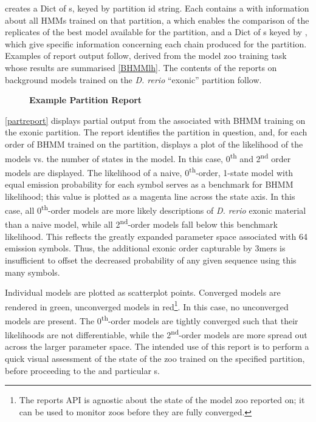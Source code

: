 creates a Dict of s, keyed by partition id string. Each  contains a  with information about all HMMs trained on that partition, a  which enables the comparison of the replicates of the best model available for the partition, and a Dict of s keyed by , which give specific information concerning each chain produced for the partition. Examples of report output follow, derived from the model zoo training task whose results are summarised \autoref{BHMMlh}. The contents of the reports on background models trained on the \textit{D. rerio} ``exonic'' partition follow.

\begin{figure}[!h]
    \caption{{\bf Example \protect{} Partition Report}}
    \label{partreport}
\end{figure}

\autoref{partreport} displays partial output from the  associated with BHMM training on the exonic partition. The report identifies the partition in question, and, for each order of BHMM trained on the partition, displays a plot of the likelihood of the models vs. the number of states in the model. In this case, 0\textsuperscript{th} and 2\textsuperscript{nd} order models are displayed. The likelihood of a naive, 0\textsuperscript{th}-order, 1-state model with equal emission probability for each symbol serves as a benchmark for BHMM likelihood; this value is plotted as a magenta line across the state axis. In this case, all 0\textsuperscript{th}-order models are more likely descriptions of \textit{D. rerio} exonic material than a naive model, while all 2\textsuperscript{nd}-order models fall below this benchmark likelihood. This reflects the greatly expanded parameter space associated with 64 emission symbols. Thus, the additional exonic order capturable by 3mers is insufficient to offset the decreased probability of any given sequence using this many symbols.

Individual models are plotted as scatterplot points. Converged models are rendered in green, unconverged models in red\footnote{The reports API is agnostic about the state of the model zoo reported on; it can be used to monitor zoos before they are fully converged.}. In this case, no unconverged models are present. The 0\textsuperscript{th}-order models are tightly converged such that their likelihoods are not differentiable, while the 2\textsuperscript{nd}-order models are more spread out across the larger parameter space. The intended use of this report is to perform a quick visual assessment of the state of the zoo trained on the specified partition, before proceeding to the  and particular s.

